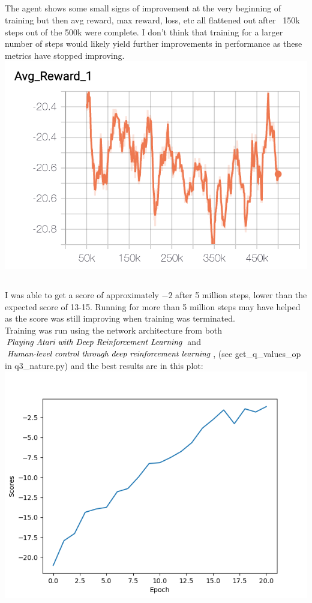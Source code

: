 \documentclass[10pt,a4paper]{article}
\begin{document}
  \subsection{}
  The agent shows some small signs of improvement at the very beginning of training but then avg reward, max reward, loss, etc all flattened out after ~150k steps out of the 500k were complete.  I don't think that training for a larger number of steps would likely yield further improvements in performance as these metrics have stopped improving. \\
  \includegraphics[scale=0.5]{q4_avg_reward.png}
  
  \subsection{}
  I was able to get a score of approximately $-2$ after 5 million steps, lower than the expected score of 13-15.  Running for more than 5 million steps may have helped as the score was still improving when training was terminated.  \\
  Training was run using the network architecture from both \\ $\emph{Playing Atari with Deep Reinforcement Learning}$ and \\
  $\emph{Human-level control through deep reinforcement learning}$, 
  (see get\_q\_values\_op in q3\_nature.py) and the best results are in this plot: \\
  \includegraphics[scale=0.5]{scores_q5_atari_nature.png}
\end{document}
